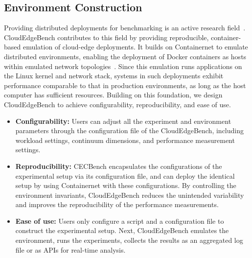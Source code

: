 \documentclass[runningheads]{llncs}
\begin{document}
\subsection{Environment Construction} 
\label{achieve-scalable-distro} 
Providing distributed deployments for benchmarking is an active research field~\cite{sps_survey_2024,qu22}.
CloudEdgeBench contributes to this field by providing reproducible, container-based emulation of cloud-edge deployments.
It builds on Containernet to emulate distributed environments, enabling the deployment of Docker containers as hosts within emulated network topologies~\cite{containernet}.
Since this emulation runs applications on the Linux kernel and network stack, systems in such deployments exhibit performance comparable to that in production environments, as long as the host computer has sufficient resources.
Building on this foundation, we design CloudEdgeBench to achieve configurability, reproducibility, and ease of use.
\begin{itemize}
    \item \textbf{Configurability:} Users can adjust all the experiment and environment parameters through the configuration file of the CloudEdgeBench, including workload settings, continuum dimensions, and performance measurement settings.
    \item \textbf{Reproducibility:} CECBench encapsulates the configurations of the experimental setup via its configuration file, and can deploy the identical setup by using Containernet with these configurations.
    By controlling the environment invariants, CloudEdgeBench reduces the unintended variability and improves the reproducibility of the performance measurements.
    \item \textbf{Ease of use:} Users only configure a script and a configuration file to construct the experimental setup.
    Next, CloudEdgeBench emulates the environment, runs the experiments, collects the results as an aggregated log file or as APIs for real-time analysis.
\end{itemize}
\end{document}
